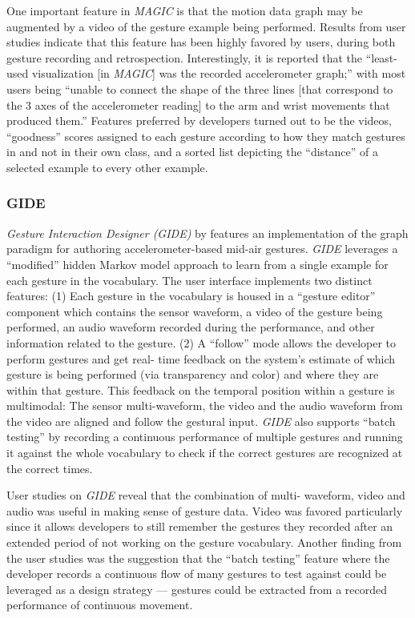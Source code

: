One important feature in \emph{MAGIC} is that the motion data graph may be augmented by a video of the gesture example being performed. Results from user studies indicate that this feature has been highly favored by users, during both gesture recording and retrospection. Interestingly, it is reported that the “least-used visualization [in \emph{MAGIC}] was the recorded accelerometer graph;” with most users being “unable to connect the shape of the three lines [that correspond to the 3 axes of the accelerometer reading] to the arm and wrist movements that produced them.” Features preferred by developers turned out to be the videos, “goodness” scores assigned to each gesture according to how they match gestures in and not in their own class, and a sorted list depicting the “distance” of a selected example to every other example.

\subsubsection{GIDE}

\emph{Gesture Interaction Designer (GIDE)} by \textcite{Zamborlin:2014} features an implementation of the graph paradigm for authoring accelerometer-based mid-air gestures. \emph{GIDE} leverages a “modified” hidden Markov model approach to learn from a single example for each gesture in the vocabulary. The user interface implements two distinct features: (1) Each gesture in the vocabulary is housed in a “gesture editor” component which contains the sensor waveform, a video of the gesture being performed, an audio waveform recorded during the performance, and other information related to the gesture. (2) A “follow” mode allows the developer to perform gestures and get real- time feedback on the system’s estimate of which gesture is being performed (via transparency and color) and where they are within that gesture. This feedback on the temporal position within a gesture is multimodal: The sensor multi-waveform, the video and the audio waveform from the video are aligned and follow the gestural input. \emph{GIDE} also supports “batch testing” by recording a continuous performance of multiple gestures and running it against the whole vocabulary to check if the correct gestures are recognized at the correct times.

User studies on \emph{GIDE} reveal that the combination of multi- waveform, video and audio was useful in making sense of gesture data. Video was favored particularly since it allows developers to still remember the gestures they recorded after an extended period of not working on the gesture vocabulary. Another finding from the user studies was the suggestion that the “batch testing” feature where the developer records a continuous flow of many gestures to test against could be leveraged as a design strategy --- gestures could be extracted from a recorded performance of continuous movement.

